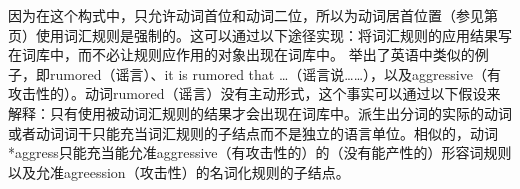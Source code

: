 \begin{exe}
\begin{xlist}[iv.]
\begin{exe}
\begin{xlist}[iv.]
\z
因为在这个构式中，只允许动词首位和动词二位，所以为动词居首位置（参见第\pageref{lr-verb-movement}页）使用词汇规则是强制的。这可以通过以下途径实现：将词汇规则的应用结果写在词库中，而不必让规则应作用的对象出现在词库中。 \citet[\S~3.4.2, 5.3]{Koenig99a}举出了英语中类似的例子，即rumored（谣言）、it is rumored that \ldots（谣言说……），以及aggressive（有攻击性的）。动词rumored（谣言）没有主动形式，这个事实可以通过以下假设来解释：只有使用被动词汇规则的结果才会出现在词库中。派生出分词的实际的动词或者动词词干只能充当词汇规则的子结点而不是独立的语言单位。相似的，动词*aggress只能充当能允准aggressive（有攻击性的）的（没有能产性的）形容词规则以及允准agreession（攻击性）的名词化规则的子结点。


\end{xlist}
\end{exe}
\end{xlist}
\end{exe}
